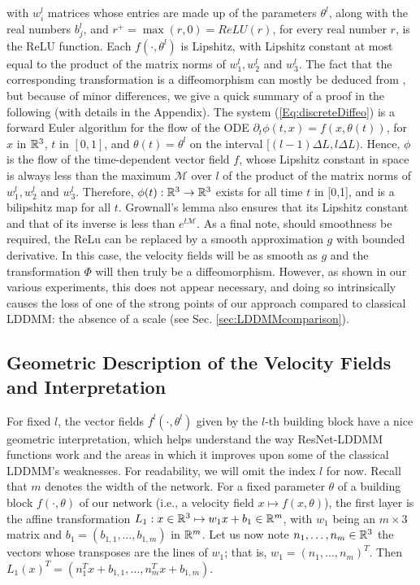 with $w_i^l$ matrices whose entries are made up of the parameters $\theta^l$, along with the real numbers $b_j^l$, and $r^+=\max(r,0)=ReLU(r)$, for every real number $r$, is the ReLU function. Each $f(\cdot,\theta^l)$ is Lipshitz, with Lipshitz constant at most equal to the product of the matrix norms of $w_1^l,w_2^l$ and $w_3^l$. The fact that the corresponding transformation is a diffeomorphism can mostly be deduced from  \cite{rousseau2020residual}, but because of minor differences, we give a quick summary of a proof in the following (with details in the Appendix). The system (\ref{Eq:discreteDiffeo}) is a forward Euler algorithm for the flow of the ODE $\partial_t\phi(t,x)=f(x,\theta(t))$, for $x$ in $\mathbb{R}^3$, $t$ in $[0,1]$, and $\theta(t)=\theta^l$ on the interval $[(l-1)\Delta L,l\Delta L)$. Hence, $\phi$ is the flow of the time-dependent vector field $f$, whose Lipshitz constant in space is always less than the maximum $\mathcal{M}$ over $l$ of the product of the matrix norms of $w_1^l,w_2^l$ and $w_3^l$. Therefore, $\phi(t):\mathbb{R}^3\rightarrow\mathbb{R}^3$ exists for all time $t$ in [0,1], and is a bilipshitz map for all $t$. Grownall's lemma also ensures that its Lipshitz constant and that of its inverse is less than $e^{t\mathcal{M}}$. As a final note, should smoothness be required, the ReLu can be replaced by a smooth approximation $g$ with bounded derivative. In this case, the velocity fields will be as smooth as $g$ and the transformation $\Phi$ will then truly be a diffeomorphism. However, as shown in our various experiments, this does not appear necessary, and doing so intrinsically causes the loss of one of the strong points of our approach compared to classical LDDMM: the absence of a scale (see Sec. \ref{sec:LDDMMcomparison}).

\subsection{Geometric Description of the Velocity Fields and Interpretation}
\label{sec:GeometricDescription}

For fixed $l$, the vector fields $f^l(\cdot,\theta^l)$ given by the $l$-th building block have a nice geometric interpretation, which helps understand the way ResNet-LDDMM functions work and the areas in which it improves upon some of the classical LDDMM's weaknesses. For readability, we will omit the index $l$ for now. Recall that $m$ denotes the width of the network. For a fixed parameter $\theta$ of a building block $f(\cdot,\theta)$ of our network  (i.e., a velocity field $x\mapsto f(x,\theta) $), the first layer is the affine transformation $L_1:x\in\mathbb{R}^3\mapsto w_1x+b_1\in \mathbb{R}^m$, with $w_1$ being an $m\times 3$ matrix and $b_1=(b_{1,1},\dots,b_{1,m})$ in $\mathbb{R}^m$. Let us now note $n_1,\dots, n_m\in \mathbb{R}^3$ the vectors whose transposes are the lines of $w_1$; that is, $w_1=(n_1,\dots,n_m)^T$. Then $L_1(x)^T=(n_1^Tx+b_{1,1},\dots,n_m^Tx+b_{1,m})$. 

